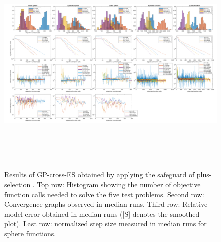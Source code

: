 \begin{center}
\begin{figure}
\includegraphics[height=4.3in, width=6.1in]{merged_plot_emergency_v4_final.pdf}
\caption{Results of GP-cross-ES obtained by applying the safeguard of plus-selection . Top row: Histogram showing the number of objective function calls needed to solve the five test problems. Second row: Convergence graphs observed in median runs. Third row: Relative model error obtained in median runs ([S] denotes the smoothed plot). Last row: normalized step size measured in median runs for sphere functions. }
\label{fig:merged_plot_GP-cross-ES}
\end{figure}
\end{center}




